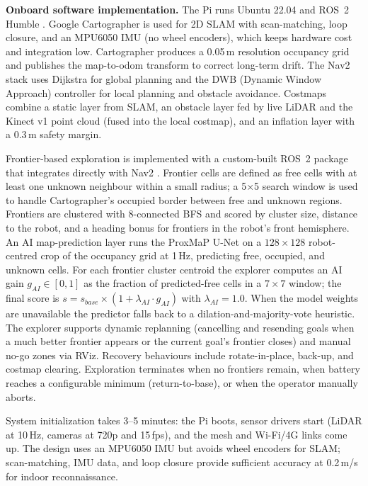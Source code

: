 \textbf{Onboard software implementation.} The Pi runs Ubuntu 22.04 \cite{ubuntuhelp} and ROS~2 Humble \cite{ros2humble}. Google Cartographer \cite{hess2016} is used for 2D SLAM with scan-matching, loop closure, and an MPU6050 IMU (no wheel encoders), which keeps hardware cost and integration low. Cartographer produces a 0.05\,m resolution occupancy grid and publishes the map-to-odom transform to correct long-term drift. The Nav2 stack \cite{nav2dwb} uses Dijkstra for global planning and the DWB (Dynamic Window Approach) controller for local planning and obstacle avoidance. Costmaps combine a static layer from SLAM, an obstacle layer fed by live LiDAR and the Kinect v1 point cloud (fused into the local costmap), and an inflation layer with a 0.3\,m safety margin.

Frontier-based exploration is implemented with a custom-built ROS~2 package that integrates directly with Nav2 \cite{nav2dwb}. Frontier cells are defined as free cells with at least one unknown neighbour within a small radius; a 5×5 search window is used to handle Cartographer's occupied border between free and unknown regions. Frontiers are clustered with 8-connected BFS and scored by cluster size, distance to the robot, and a heading bonus for frontiers in the robot's front hemisphere. An AI map-prediction layer runs the ProxMaP U-Net \cite{sharma2022} on a $128\times128$ robot-centred crop of the occupancy grid at 1\,Hz, predicting free, occupied, and unknown cells. For each frontier cluster centroid the explorer computes an AI gain $g_{AI} \in [0,1]$ as the fraction of predicted-free cells in a $7\times7$ window; the final score is $s = s_{base} \times (1 + \lambda_{AI} \cdot g_{AI})$ with $\lambda_{AI} = 1.0$. When the model weights are unavailable the predictor falls back to a dilation-and-majority-vote heuristic. The explorer supports dynamic replanning (cancelling and resending goals when a much better frontier appears or the current goal's frontier closes) and manual no-go zones via RViz. Recovery behaviours include rotate-in-place, back-up, and costmap clearing. Exploration terminates when no frontiers remain, when battery reaches a configurable minimum (return-to-base), or when the operator manually aborts.

System initialization takes 3--5 minutes: the Pi boots, sensor drivers start (LiDAR at 10\,Hz, cameras at 720p and 15\,fps), and the mesh and Wi-Fi/4G links come up. The design uses an MPU6050 IMU but avoids wheel encoders for SLAM; scan-matching, IMU data, and loop closure provide sufficient accuracy at 0.2\,m/s for indoor reconnaissance.

